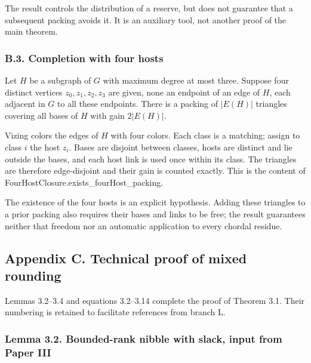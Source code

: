 \documentclass[english,11pt,a4paper]{article}
\newcounter{none}
\begin{document}
The result controls the distribution of a reserve, but does not guarantee that a subsequent packing avoids it. It is an auxiliary tool, not another proof of the main theorem.

\subsubsection{B.3. Completion with four hosts}\label{b.3.-completion-with-four-hosts}

Let \(H\) be a subgraph of \(G\) with maximum degree at most three. Suppose four distinct vertices \(z_0,z_1,z_2,z_3\) are given, none an endpoint of an edge of \(H\), each adjacent in \(G\) to all these endpoints. There is a packing of \(|E(H)|\) triangles covering all bases of \(H\) with gain \(2|E(H)|\).

Vizing colors the edges of \(H\) with four colors. Each class is a matching; assign to class \(i\) the host \(z_i\). Bases are disjoint between classes, hosts are distinct and lie outside the bases, and each host link is used once within its class. The triangles are therefore edge-disjoint and their gain is counted exactly. This is the content of {\ttfamily\small FourHostClos\discretionary{\hbox{\ensuremath{\hookrightarrow}}}{}{}ure.\discretionary{\hbox{\ensuremath{\hookrightarrow}}}{}{}exists\_\discretionary{\hbox{\ensuremath{\hookrightarrow}}}{}{}fourHost\_\discretionary{\hbox{\ensuremath{\hookrightarrow}}}{}{}packing}.

The existence of the four hosts is an explicit hypothesis. Adding these triangles to a prior packing also requires their bases and links to be free; the result guarantees neither that freedom nor an automatic application to every chordal residue.

\subsection{Appendix C. Technical proof of mixed rounding}\label{appendix-c.-technical-proof-of-mixed-rounding}

Lemmas 3.2--3.4 and equations 3.2--3.14 complete the proof of Theorem 3.1. Their numbering is retained to facilitate references from branch L.

\subsubsection{Lemma 3.2. Bounded-rank nibble with slack, input from Paper III}\label{lemma-3.2.-bounded-rank-nibble-with-slack-input-from-paper-iii}
\end{document}
